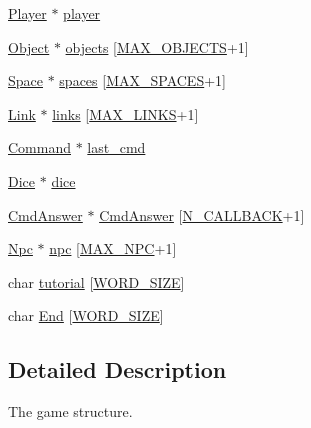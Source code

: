 \begin{DoxyCompactItemize}
\item 
\hyperlink{player_8h_af30e2030635a69690f85e48bc6ef202f}{Player} $\ast$ \hyperlink{struct__Game_a31406605782d71ec00c4bf258ea76267}{player}
\item 
\hyperlink{object_8h_a7f8bbcda919b65ce67f92fba08e0212f}{Object} $\ast$ \hyperlink{struct__Game_aa669bb857944c6c3b53504d179640af0}{objects} \mbox{[}\hyperlink{game_8h_acdc7844fbd4d45737d4aa56834d37829}{M\+A\+X\+\_\+\+O\+B\+J\+E\+C\+TS}+1\mbox{]}
\item 
\hyperlink{space_8h_a67533ffc2b70463baecc38fb0629bbfc}{Space} $\ast$ \hyperlink{struct__Game_ab4180417d9148f8abb2233ca6c4ecfe5}{spaces} \mbox{[}\hyperlink{space_8h_a5f54fd55f983a2e33ce076cd9f587e82}{M\+A\+X\+\_\+\+S\+P\+A\+C\+ES}+1\mbox{]}
\item 
\hyperlink{link_8h_ae3b299941e67be6971bfd64a25505eff}{Link} $\ast$ \hyperlink{struct__Game_a672f97aff892c65a6fdb43665cb57c97}{links} \mbox{[}\hyperlink{link_8h_a660ed1ec8604982002a0d6eced0e0367}{M\+A\+X\+\_\+\+L\+I\+N\+KS}+1\mbox{]}
\item 
\hyperlink{command_8h_a7d2935971c252377cb0fc1c8545dc2bc}{Command} $\ast$ \hyperlink{struct__Game_a47afef4b632256566d81da0f50e7a380}{last\+\_\+cmd}
\item 
\hyperlink{dice_8h_a5910ae86cf402855269700abd23e3976}{Dice} $\ast$ \hyperlink{struct__Game_af7004361a877182511a3e501b0949220}{dice}
\item 
\hyperlink{cmdAnswer_8h_a2e704274c270f99c8eaf383d11982d03}{Cmd\+Answer} $\ast$ \hyperlink{struct__Game_a4a34733add6a619004edb7326a8c300f}{Cmd\+Answer} \mbox{[}\hyperlink{game_8c_a8366e5ad74afbbea0cd0a414770c304a}{N\+\_\+\+C\+A\+L\+L\+B\+A\+CK}+1\mbox{]}
\item 
\hyperlink{npc_8h_a9529f25eaef52ee65aa84d4df6bb2d49}{Npc} $\ast$ \hyperlink{struct__Game_a41e78cf09a2a3fc90d9f27c99bdf9d3c}{npc} \mbox{[}\hyperlink{game_8c_a77f90fdf4bfbf2b0b6b5aded5458328d}{M\+A\+X\+\_\+\+N\+PC}+1\mbox{]}
\item 
char \hyperlink{struct__Game_a515c9531e4c918cd117ac503cf513076}{tutorial} \mbox{[}\hyperlink{types_8h_a92ed8507d1cd2331ad09275c5c4c1c89}{W\+O\+R\+D\+\_\+\+S\+I\+ZE}\mbox{]}
\item 
char \hyperlink{struct__Game_a712217e97c6ca0b8907fe40e4dc066c7}{End} \mbox{[}\hyperlink{types_8h_a92ed8507d1cd2331ad09275c5c4c1c89}{W\+O\+R\+D\+\_\+\+S\+I\+ZE}\mbox{]}
\end{DoxyCompactItemize}


\subsection{Detailed Description}
The game structure. 

